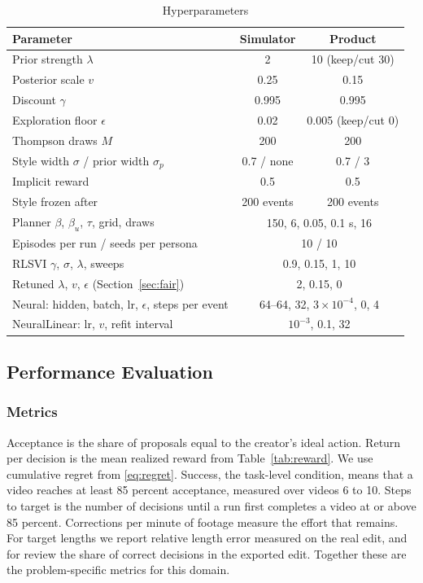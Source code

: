 \documentclass{ieeeaccess}
\begin{document}
\begin{table}[t]
\caption{Hyperparameters}
\label{tab:hyper}
\setlength{\tabcolsep}{3pt}
\centering
\begin{tabular}{|p{42mm}|c|c|}
\hline
Parameter & Simulator & Product \\
\hline
Prior strength $\lambda$ & 2 & 10 (keep/cut 30) \\
Posterior scale $v$ & 0.25 & 0.15 \\
Discount $\gamma$ & 0.995 & 0.995 \\
Exploration floor $\epsilon$ & 0.02 & 0.005 (keep/cut 0) \\
Thompson draws $M$ & 200 & 200 \\
Style width $\sigma$ / prior width $\sigma_p$ & 0.7 / none & 0.7 / 3 \\
Implicit reward & 0.5 & 0.5 \\
Style frozen after & 200 events & 200 events \\
Planner $\beta$, $\beta_u$, $\tau$, grid, draws & \multicolumn{2}{c|}{150, 6, 0.05, 0.1 s, 16} \\
Episodes per run / seeds per persona & \multicolumn{2}{c|}{10 / 10} \\
RLSVI $\gamma$, $\sigma$, $\lambda$, sweeps & \multicolumn{2}{c|}{0.9, 0.15, 1, 10} \\
Retuned $\lambda$, $v$, $\epsilon$ (Section~\ref{sec:fair}) & \multicolumn{2}{c|}{2, 0.15, 0} \\
Neural: hidden, batch, lr, $\epsilon$, steps per event & \multicolumn{2}{c|}{64--64, 32, $3{\times}10^{-4}$, 0, 4} \\
NeuralLinear: lr, $v$, refit interval & \multicolumn{2}{c|}{$10^{-3}$, 0.1, 32} \\
\hline
\end{tabular}
\end{table}

\subsection{Performance Evaluation}

\subsubsection{Metrics}
Acceptance is the share of proposals equal to the creator's ideal action. Return per decision is the mean realized reward from Table~\ref{tab:reward}. We use cumulative regret from \eqref{eq:regret}. Success, the task-level condition, means that a video reaches at least 85 percent acceptance, measured over videos 6 to 10. Steps to target is the number of decisions until a run first completes a video at or above 85 percent. Corrections per minute of footage measure the effort that remains. For target lengths we report relative length error measured on the real edit, and for review the share of correct decisions in the exported edit. Together these are the problem-specific metrics for this domain.
\end{document}
